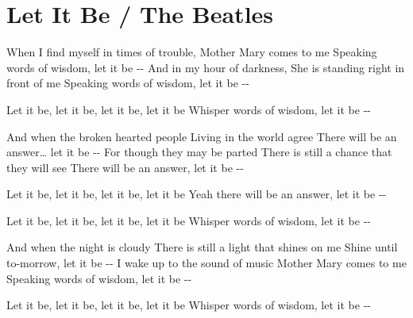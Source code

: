 \section{Let It Be / The Beatles}\label{sec:letitbe}
\Cmajor
\Gmajor
\Aminor
\Fmajor
\Dminor
\Eminor

When I  find myself in  times of trouble,
 Mother Mary comes to me
 Speaking words of  wisdom, let it  be --
And  in my hour of  darkness,
She is  standing right in  front of me
 Speaking words of  wisdom, let it  be --

Let it  be, let it  be, let it  be, let it  be
 Whisper words of  wisdom, let it  be --

And  when the broken  hearted people
 Living in the  world agree
 There will be an  answer… let it  be --
For  though they may be  parted
There is  still a chance that  they will see
 There will be an  answer, let it  be --

Let it  be, let it  be, let it  be, let it  be
Yeah  there will be an  answer, let it  be --

Let it  be, let it  be, let it  be, let it  be
 Whisper words of  wisdom, let it be --

And  when the night is  cloudy
There is  still a light that  shines on me
 Shine until to-morrow, let it  be --
I  wake up to the  sound of music
 Mother Mary  comes to me
 Speaking words of  wisdom, let it  be --

Let it  be, let it  be, let it  be, let it  be
 Whisper words of  wisdom, let it be --
